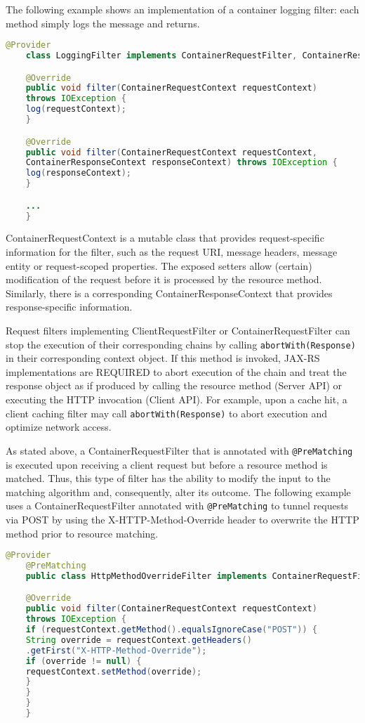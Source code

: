 The following example shows an implementation of a container logging filter: each method simply logs the message and
returns.

\begin{lstlisting}[language=Java]
    @Provider
    class LoggingFilter implements ContainerRequestFilter, ContainerResponseFilter {

    @Override
    public void filter(ContainerRequestContext requestContext)
    throws IOException {
    log(requestContext);
    }

    @Override
    public void filter(ContainerRequestContext requestContext,
    ContainerResponseContext responseContext) throws IOException {
    log(responseContext);
    }

    ...
    }
\end{lstlisting}

ContainerRequestContext is a mutable class that provides request-specific information for the filter, such as the
request URI, message headers, message entity or request-scoped properties. The exposed setters allow (certain)
modification of the request before it is processed by the resource method. Similarly, there is a corresponding
ContainerResponseContext that provides response-specific information.

Request filters implementing ClientRequestFilter or ContainerRequestFilter can stop the execution of their corresponding
chains by calling \lstinline{abortWith(Response)} in their corresponding context object. If this method is invoked,
JAX-RS implementations are REQUIRED to abort execution of the chain and treat the response object as if produced by
calling the resource method (Server API) or executing the HTTP invocation (Client API). For example, upon a cache hit,
a client caching filter may call \lstinline{abortWith(Response)} to abort execution and optimize network access.

As stated above, a ContainerRequestFilter that is annotated with \lstinline{@PreMatching} is executed upon receiving a
client request but before a resource method is matched. Thus, this type of filter has the ability to modify the input to
the matching algorithm and, consequently, alter its outcome. The following example uses a ContainerRequestFilter
annotated with \lstinline{@PreMatching} to tunnel requests via POST by using the X-HTTP-Method-Override header to
overwrite the HTTP method prior to resource matching.

\begin{lstlisting}[language=Java]
    @Provider
    @PreMatching
    public class HttpMethodOverrideFilter implements ContainerRequestFilter {

    @Override
    public void filter(ContainerRequestContext requestContext)
    throws IOException {
    if (requestContext.getMethod().equalsIgnoreCase("POST")) {
    String override = requestContext.getHeaders()
    .getFirst("X-HTTP-Method-Override");
    if (override != null) {
    requestContext.setMethod(override);
    }
    }
    }
    }
\end{lstlisting}

